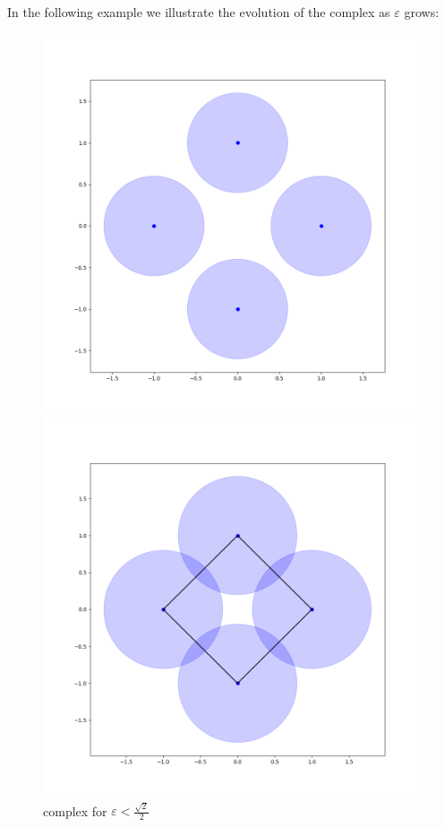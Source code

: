 In the following example we illustrate the evolution of the {\Cech}
complex as $\varepsilon$ grows:

\begin{figure}[!htb]
  \includegraphics[width=\linewidth]{imgs/cech_example_1_0_6.png}
  \caption{
  {\Cech} complex for $\varepsilon<\frac{\sqrt{2}}{2}$
  }
  \label{fig:awesome_image1}
\endminipage\hfill
{}
  \includegraphics[width=\linewidth]{imgs/cech_example_1_0_8.png}

\end{figure}
